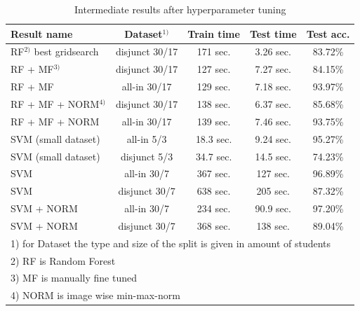 \documentclass[conference]{IEEEtran}
\begin{document}
\begin{table}[hb!]
    \caption{Intermediate results after hyperparameter tuning}
    \begin{center}
    \setlength{\tabcolsep}{3pt}
    \begin{tabular}{|l|c|c|c|c|}
        \hline
        \textbf{Result name} & \textbf{Dataset$^{1)}$} & \textbf{Train time} & \textbf{Test time} & \textbf{Test acc.} \\
        \hline
        RF$^{2)}$ best gridsearch & disjunct 30/17 & 171 sec. & 3.26 sec. & 83.72\% \\
        \hline
        RF + MF$^{3)}$ & disjunct 30/17 & 127 sec. & 7.27 sec. & 84.15\% \\
        \hline
        RF + MF & all-in 30/17 & 129 sec. & 7.18 sec. & 93.97\% \\
        \hline
        RF + MF + NORM$^{4)}$ & disjunct 30/17 & 138 sec. & 6.37 sec. & 85.68\% \\
        \hline
        RF + MF + NORM & all-in 30/17 & 139 sec. & 7.46 sec. & 93.75\% \\
        \hline
        SVM (small dataset) & all-in 5/3 & 18.3 sec. & 9.24 sec. & 95.27\% \\
        \hline
        SVM (small dataset) & disjunct 5/3 & 34.7 sec. & 14.5 sec. & 74.23\% \\
        \hline
        SVM  & all-in 30/7 & 367 sec. & 127 sec. & 96.89\% \\
        \hline
        SVM  & disjunct 30/7 & 638 sec. & 205 sec. & 87.32\% \\
        \hline
        SVM + NORM & all-in 30/7 & 234 sec. & 90.9 sec. & 97.20\% \\
        \hline
        SVM + NORM & disjunct 30/7 & 368 sec. & 138 sec. & 89.04\% \\
        \hline

        \multicolumn{5}{l}{1) for Dataset the type and size of the split is given in amount of students } \\
        \multicolumn{5}{l}{2) RF is Random Forest } \\
        \multicolumn{5}{l}{3) MF is manually fine tuned } \\
        \multicolumn{5}{l}{4) NORM is image wise min-max-norm } \\
    \end{tabular}
    \label{table:timeIntermediateResults}
    \end{center}
\end{table}
\end{document}
